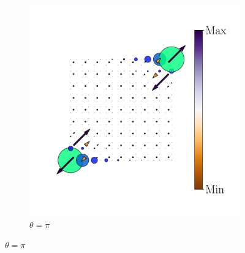 \begin{figure}[tbh!]
\begin{minipage}[h!]{1.0\textwidth}
\begin{subfigure}[b!]{0.2 \textwidth}
         \end{subfigure}\hspace*{-0.5em}
          \begin{subfigure}[b!]{0.2 \textwidth}
             \caption*{$\theta = \pi$}
             \includegraphics[width=\textwidth]{Imagenes/Resultados_pump_Cuadrado/y/hoti_pomp_y_pos5.pdf}
         \end{subfigure}\hspace*{-0.5em}
     \end{minipage}\vspace*{-1em}
     

\end{figure}
